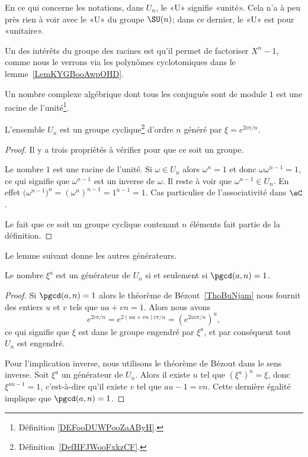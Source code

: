 \begin{normaltext}
	En ce qui concerne les notations, dans \( U_n\), le «U» signifie «unité». Cela n'a à peu près rien à voir avec le «U» du groupe \( \SU(n)\); dans ce dernier, le «U» est pour «unitaire».
\end{normaltext}

Un des intérêts du groupe des racines est qu'il permet de factoriser \( X^n-1\), comme nous le verrons via les polynômes cyclotomiques dans le lemme~\ref{LemKYGBooAwpOHD}.

\begin{lemma}       \label{LEMooBKTNooTmtUNQ}
	Un nombre complexe algébrique dont tous les conjugués sont de module \( 1\) est une racine de l'unité\footnote{Définition \ref{DEFooDUWPooZaAByH}.}.
\end{lemma}

\begin{lemma}       \label{LemWHQGooXyeJiw}
	L'ensemble \( U_n\) est un groupe cyclique\footnote{Définition~\ref{DefHFJWooFxkzCF}.} d'ordre \( n\) généré par \( \xi= e^{2i\pi/n}\).
\end{lemma}

\begin{proof}
	Il y a trois propriétés à vérifier pour que ce soit un groupe.
	\begin{subproof}
		\spitem[Neutre]
		Le nombre \( 1\) est une racine de l'unité.
		\spitem[Inverse]
		Si \( \omega\in U_n\) alors \( \omega^n=1\) et donc \( \omega\omega^{n-1}=1\), ce qui signifie que \( \omega^{n-1}\) est un inverse de \( \omega\). Il reste à voir que \( \omega^{n-1}\in U_n\). En effet \( \big( \omega^{n-1} \big)^n=(\omega^n)^{n-1}=1^{n-1}=1  \).
		\spitem[Associativité]
		Cas particulier de l'associativité dans \( \eC\).
	\end{subproof}
	Le fait que ce soit un groupe cyclique contenant \( n\) éléments fait partie de la définition.
\end{proof}

Le lemme suivant donne les autres générateurs.
\begin{lemma}   \label{LemcFTNMa}
	Le nombre \( \xi^a\) est un générateur de \( U_n\) si et seulement si \( \pgcd(a,n)=1\).
\end{lemma}

\begin{proof}
	Si \( \pgcd(a,n)=1\) alors le théorème de Bézout~\ref{ThoBuNjam} nous fournit des entiers \( u\) et \( v\) tels que \( ua+vn=1\). Alors nous avons
	\begin{equation}
		e^{2i\pi /n}= e^{2(ua+vn)i\pi/n}=( e^{2ai\pi/n})^u,
	\end{equation}
	ce qui signifie que \( \xi\) est dans le groupe engendré par \( \xi^a\), et par conséquent tout \( U_n\) est engendré.

	Pour l'implication inverse, nous utilisons le théorème de Bézout dans le sens inverse. Soit \( \xi^a\) un générateur de \( U_n\). Alors il existe \( u\) tel que \( (\xi^a)^u=\xi\), donc \( \xi^{au-1}=1\), c'est-à-dire qu'il existe \( v\) tel que \( au-1=vn\). Cette dernière égalité implique que \( \pgcd(a,n)=1\).
\end{proof}

